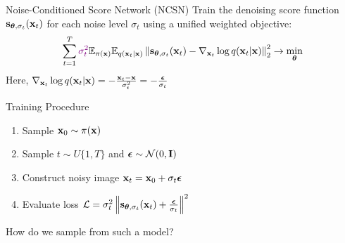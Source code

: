 \documentclass{beamer}
\begin{document}
\begin{frame}{Noise-Conditioned Score Network (NCSN)}
	Train the denoising score function $\mathbf{s}_{\boldsymbol{\theta}, \sigma_t}(\mathbf{x}_t)$ for each noise level $\sigma_t$ using a unified weighted objective:
	\vspace{-0.2cm}
	\[
		\sum_{t=1}^T {\color{violet}\sigma_t^2} \mathbb{E}_{\pi(\mathbf{x})} \mathbb{E}_{q(\mathbf{x}_t | \mathbf{x})}\left\| \mathbf{s}_{\boldsymbol{\theta}, \sigma_t}(\mathbf{x}_t) - \nabla_{\mathbf{x}_t} \log q(\mathbf{x}_t | \mathbf{x}) \right\|_2^2 \rightarrow \min_{\boldsymbol{\theta}}
	\]
    \eqpause
	Here, $\nabla_{\mathbf{x}_t} \log q(\mathbf{x}_t | \mathbf{x}) = - \frac{\mathbf{x}_t - \mathbf{x}}{\sigma_t^2} = - \frac{\boldsymbol{\epsilon}}{\sigma_t}$
    \eqpause
	\begin{block}{Training Procedure}
		\begin{enumerate}
			\item Sample $\mathbf{x}_0 \sim \pi(\mathbf{x})$
			\item Sample $t \sim U\{1, T\}$ and $\boldsymbol{\epsilon} \sim \mathcal{N}(0, \mathbf{I})$
			\item Construct noisy image $\mathbf{x}_t = \mathbf{x}_0 + \sigma_t \boldsymbol{\epsilon}$
			\item Evaluate loss $ \mathcal{L} = \sigma_t^2 \left\| \mathbf{s}_{\boldsymbol{\theta}, \sigma_t}(\mathbf{x}_t) + \frac{\boldsymbol{\epsilon}}{\sigma_t} \right\|^2 $
		\end{enumerate}
		\vspace{-0.3cm}
	\end{block}
    \eqpause
	How do we sample from such a model?
\end{frame}
\end{document}
